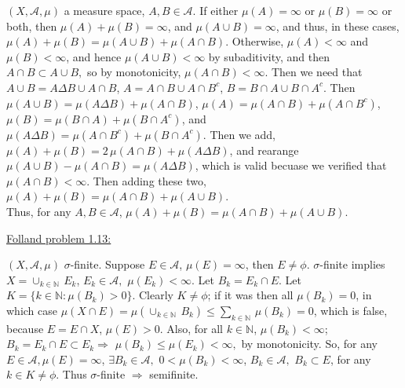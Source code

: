 \documentclass[12pt]{article}
\begin{document}
\begin{flushleft}
$(X,\mathcal{A},\mu)$ a measure space, $A,B \in \mathcal{A}$. If either $\mu(A)=\infty$ or $\mu(B)=\infty$ or both, then $\mu(A) + \mu(B)=\infty$, and $\mu(A \cup B)=\infty$, and thus, in these cases, $\mu(A) + \mu(B)= \mu(A \cup B) + \mu(A \cap B)$. Otherwise, $\mu(A)<\infty$ and $\mu(B)<\infty$, and hence $\mu(A \cup B) < \infty$ by subaditivity, and then $A \cap B \subset A \cup B,$ so by monotonicity, $\mu(A \cap B) < \infty$. Then we need that $A \cup B = A \Delta B \cup A \cap B$, $A = A \cap B \cup A \cap B^c$, $B = B \cap 
A \cup B \cap A^c$. Then $\mu(A \cup B) = \mu(A \Delta B) + \mu( A \cap B)$, $\mu(A) = \mu(A \cap B)+ \mu(A \cap B^c)$, $\mu(B) = \mu( B \cap A) + \mu(B \cap A^c)$, and $\mu(A \Delta B) = \mu(A \cap B^c)+\mu(B \cap A^c)$. Then we add, $\mu(A) + \mu(B) = 2 \, \mu(A \cap B)+ \mu(A \Delta B)$, and rearange $\mu(A \cup B)-\mu( A \cap B) = \mu(A \Delta B)$, which is valid becuase we verified that $\mu( A \cap B) < \infty.$ Then adding these two, $\mu(A) + \mu(B) = \mu(A \cap B)+ \mu(A \cup B)$.\\
Thus, for any $A,B \in \mathcal{A}$, $\mu(A) + \mu(B) = \mu(A \cap B)+ \mu(A \cup B)$.
\end{flushleft}




\begin{flushleft}
\underline{Folland problem 1.13:}
\end{flushleft}

\begin{flushleft}
$(X,\mathcal{A},\mu)$ $\sigma$-finite. Suppose $E \in \mathcal{A}$, $\mu(E) = \infty$, then $E \not = \phi$. $\sigma$-finite implies $X = \cup_{k \in \mathbb{N} } \, E_k $, $E_k \in \mathcal{A},$ $\mu(E_k) < \infty$. Let $B_k = E_k \cap E$. Let $K = \{ k \in \mathbb{N}: \mu(B_k) > 0 \}$. Clearly $K \not = \phi$; if it was then all $\mu(B_k) = 0$, in which case $\mu(X \cap E) = \mu ( \cup_{k \in \mathbb{N} } \, B_k) \le \sum_{k \in \mathbb{N} } \, \mu(B_k ) = 0$, which is false, because $E = E \cap X$, $\mu(E) > 0$. Also, for all $k \in \mathbb{N}$, $\mu(B_k) < \infty$; $B_{k} = E_{k} \cap E \subset E_{k} \Rightarrow $ $ \mu(B_{k}) \le \mu(E_{k}) < \infty,$ by monotonicity. So, for any $E \in \mathcal{A}, \mu(E) = \infty$, $\exists B_k \in \mathcal{A} ,$ $0 < \mu(B_k) < \infty$, $B_k \in \mathcal{A},$ $B_k \subset E$, for any $k \in K \not = \phi$. Thus $\sigma$-finite  $\Rightarrow$ semifinite. 


\end{flushleft}
\end{document}
